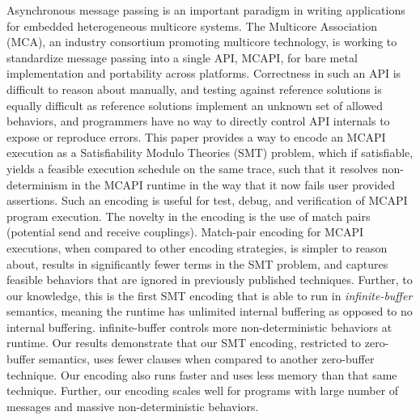 
Asynchronous message passing is an important paradigm in writing
applications for embedded heterogeneous multicore systems.  The
Multicore Association (MCA), an industry consortium promoting
multicore technology, is working to standardize message passing into a
single API, MCAPI, for bare metal implementation and portability
across platforms.  Correctness in such an API is difficult to reason
about manually, and testing against reference solutions is equally
difficult as reference solutions implement an unknown set of allowed
behaviors, and programmers have no way to directly control API
internals to expose or reproduce errors.  This paper provides a way to
encode an MCAPI execution as a Satisfiability Modulo Theories (SMT)
problem, which if satisfiable, yields a feasible execution schedule on
the same trace, such that it resolves non-determinism in the MCAPI
runtime in the way that it now fails user provided assertions.  Such
an encoding is useful for test, debug, and verification of MCAPI
program execution.  The novelty in the encoding is the use of match
pairs (potential send and receive couplings).  Match-pair encoding for
MCAPI executions, when compared to other encoding strategies, is
simpler to reason about, results in significantly fewer terms in the
SMT problem, and captures feasible behaviors that are ignored in
previously published techniques. Further, to our knowledge, this is
the first SMT encoding that is able to run in \textit{infinite-buffer}
semantics, meaning the runtime has unlimited internal buffering as
opposed to no internal buffering. %
infinite-buffer controls more non-deterministic behaviors at runtime.
Our results demonstrate that our SMT encoding, restricted to
zero-buffer semantics, uses fewer clauses when compared to another
zero-buffer technique. Our encoding also runs faster and uses less
memory than that same technique. Further, our encoding scales well for
programs with large number of messages and massive non-deterministic
behaviors.
